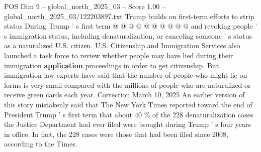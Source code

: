\begin{textsample}{POS Dim 9 – global\_north\_2025\_03 – Score 1.00 – global\_north\_2025\_03/122203897.txt}
Trump builds on first-term efforts to strip status During Trump ' s first term @ @ @ @ @ @ @ @ @ @ and revoking people ' s immigration status, including denaturalization, or canceling someone ' s status as a naturalized U.S. citizen.
U.S.
Citizenship and Immigration Services also launched a task force to review whether people may have lied during their immigration \textbf{application} proceedings in order to get citizenship.
But immigration law experts have said that the number of people who might lie on forms is very small compared with the millions of people who are naturalized or receive green cards each year.
Correction March 10, 2025 An earlier version of this story mistakenly said that The New York Times reported toward the end of President Trump ' s first term that about 40 \% of the 228 denaturalization cases the Justice Department had ever filed were brought during Trump ' s four years in office.
In fact, the 228 cases were those that had been filed since 2008, according to the Times.

\end{textsample}
